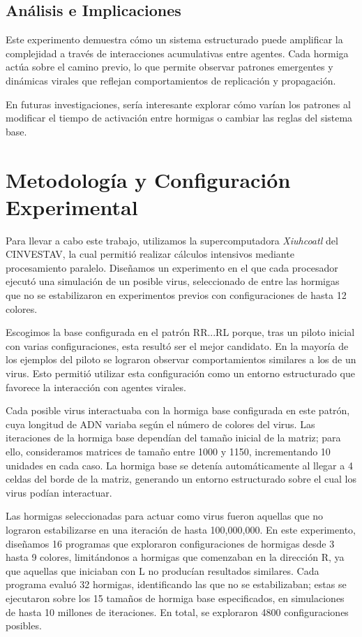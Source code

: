 \documentclass[11pt,letterpaper]{article}
\begin{document}
\begin{multicols}{2}
\subsection{Análisis e Implicaciones}
Este experimento demuestra cómo un sistema estructurado puede amplificar la complejidad a través de interacciones acumulativas entre agentes. Cada hormiga actúa sobre el camino previo, lo que permite observar patrones emergentes y dinámicas virales que reflejan comportamientos de replicación y propagación.

En futuras investigaciones, sería interesante explorar cómo varían los patrones al modificar el tiempo de activación entre hormigas o cambiar las reglas del sistema base.                                                                                                                           

\section{Metodología y Configuración Experimental}

Para llevar a cabo este trabajo, utilizamos la supercomputadora \textit{Xiuhcoatl} del CINVESTAV, la cual permitió realizar cálculos intensivos mediante procesamiento paralelo. Diseñamos un experimento en el que cada procesador ejecutó una simulación de un posible virus, seleccionado de entre las hormigas que no se estabilizaron en experimentos previos con configuraciones de hasta 12 colores.

Escogimos la base configurada en el patrón RR...RL porque, tras un piloto inicial con varias configuraciones, esta resultó ser el mejor candidato. En la mayoría de los ejemplos del piloto se lograron observar comportamientos similares a los de un virus. Esto permitió utilizar esta configuración como un entorno estructurado que favorece la interacción con agentes virales.

Cada posible virus interactuaba con la hormiga base configurada en este patrón, cuya longitud de ADN variaba según el número de colores del virus. Las iteraciones de la hormiga base dependían del tamaño inicial de la matriz; para ello, consideramos matrices de tamaño entre 1000 y 1150, incrementando 10 unidades en cada caso. La hormiga base se detenía automáticamente al llegar a 4 celdas del borde de la matriz, generando un entorno estructurado sobre el cual los virus podían interactuar.

Las hormigas seleccionadas para actuar como virus fueron aquellas que no lograron estabilizarse en una iteración de hasta 100,000,000. En este experimento, diseñamos 16 programas que exploraron configuraciones de hormigas desde 3 hasta 9 colores, limitándonos a hormigas que comenzaban en la dirección R, ya que aquellas que iniciaban con L no producían resultados similares. Cada programa evaluó 32 hormigas, identificando las que no se estabilizaban; estas se ejecutaron sobre los 15 tamaños de hormiga base especificados, en simulaciones de hasta 10 millones de iteraciones. En total, se exploraron 4800 configuraciones posibles.


\end{multicols}
\end{document}
